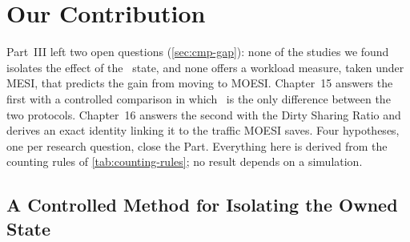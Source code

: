 
\newtheorem{proposition}{Proposition}[chapter]

\part{Our Contribution}
\label{part:contribution}

\begin{center}
\end{center}

\begin{keybox}
Part~III left two open questions (\cref{sec:cmp-gap}): none of the studies we
found isolates the effect of the \stO\ state, and none offers a workload measure,
taken under MESI, that predicts the gain from moving to MOESI. Chapter~15 answers
the first with a controlled comparison in which \stO\ is the only difference
between the two protocols. Chapter~16 answers the second with the Dirty Sharing
Ratio and derives an exact identity linking it to the traffic MOESI saves. Four
hypotheses, one per research question, close the Part. Everything here is derived
from the counting rules of \cref{tab:counting-rules}; no result depends on a
simulation.
\end{keybox}

\chapter{A Controlled Method for Isolating the Owned State}
\label{ch:method}

